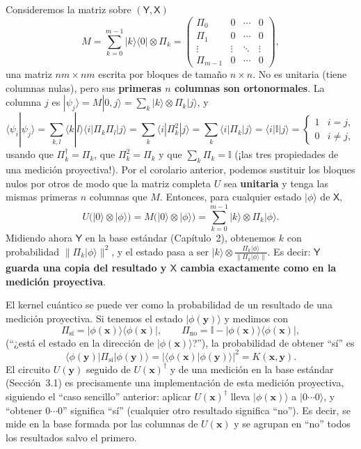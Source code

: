 \documentclass[11pt, a4paper, twoside, openright]{report}
\begin{document}
\noindent Consideremos la matriz sobre $(\mathsf{Y},\mathsf{X})$
\[ M = \sum_{k=0}^{m-1}|k\rangle\langle0|\otimes\Pi_k = \begin{pmatrix} \Pi_0 & 0 & \cdots & 0\\ \Pi_1 & 0 & \cdots & 0\\ \vdots & \vdots & \ddots & \vdots\\ \Pi_{m-1} & 0 & \cdots & 0\end{pmatrix}, \]
una matriz $nm\times nm$ escrita por bloques de tamaño $n\times n$. No es unitaria (tiene columnas nulas), pero sus \textbf{primeras $n$ columnas son ortonormales}. La columna $j$ es $|\psi_j\rangle = M|0,j\rangle = \sum_k|k\rangle\otimes\Pi_k|j\rangle$, y
\[ \langle\psi_i|\psi_j\rangle = \sum_{k,l}\langle k|l\rangle\langle i|\Pi_k\Pi_l|j\rangle = \sum_k\langle i|\Pi_k^2|j\rangle = \sum_k\langle i|\Pi_k|j\rangle = \langle i|\mathbb{I}|j\rangle = \begin{cases}1 & i=j,\\0 & i\neq j,\end{cases} \]
usando que $\Pi_k^\dagger = \Pi_k$, que $\Pi_k^2 = \Pi_k$ y que $\sum_k\Pi_k = \mathbb{I}$ (¡las tres propiedades de una medición proyectiva!). Por el corolario anterior, podemos sustituir los bloques nulos por otros de modo que la matriz completa $U$ sea \textbf{unitaria} y tenga las mismas primeras $n$ columnas que $M$. Entonces, para cualquier estado $|\phi\rangle$ de $\mathsf{X}$,
\[ U\big(|0\rangle\otimes|\phi\rangle\big) = M\big(|0\rangle\otimes|\phi\rangle\big) = \sum_{k=0}^{m-1}|k\rangle\otimes\Pi_k|\phi\rangle. \]
Midiendo ahora $\mathsf{Y}$ en la base estándar (Capítulo~2), obtenemos $k$ con probabilidad $\|\Pi_k|\phi\rangle\|^2$, y el estado pasa a ser $|k\rangle\otimes\frac{\Pi_k|\phi\rangle}{\|\Pi_k|\phi\rangle\|}$. Es decir: \textbf{$\mathsf{Y}$ guarda una copia del resultado y $\mathsf{X}$ cambia exactamente como en la medición proyectiva}.

\begin{tcolorbox}[colback=teal!5!white,colframe=teal!75!black,title=\textbf{Conexión con el TFG: el kernel como medición proyectiva}]
El kernel cuántico se puede ver como la probabilidad de un resultado de una medición proyectiva. Si tenemos el estado $|\phi(\mathbf{y})\rangle$ y medimos con
\[ \Pi_{\text{sí}} = |\phi(\mathbf{x})\rangle\langle\phi(\mathbf{x})|, \qquad \Pi_{\text{no}} = \mathbb{I} - |\phi(\mathbf{x})\rangle\langle\phi(\mathbf{x})|, \]
(``¿está el estado en la dirección de $|\phi(\mathbf{x})\rangle$?''), la probabilidad de obtener ``sí'' es
\[ \langle\phi(\mathbf{y})|\Pi_{\text{sí}}|\phi(\mathbf{y})\rangle = |\langle\phi(\mathbf{x})|\phi(\mathbf{y})\rangle|^2 = K(\mathbf{x},\mathbf{y}). \]
El circuito $U(\mathbf{y})$ seguido de $U(\mathbf{x})^\dagger$ y de una medición en la base estándar (Sección~3.1) es precisamente una implementación de esta medición proyectiva, siguiendo el ``caso sencillo'' anterior: aplicar $U(\mathbf{x})^\dagger$ lleva $|\phi(\mathbf{x})\rangle$ a $|0\cdots0\rangle$, y ``obtener $0\cdots0$'' significa ``sí'' (cualquier otro resultado significa ``no''). Es decir, se mide en la base formada por las columnas de $U(\mathbf{x})$ y se agrupan en ``no'' todos los resultados salvo el primero.
\end{tcolorbox}
\end{document}
